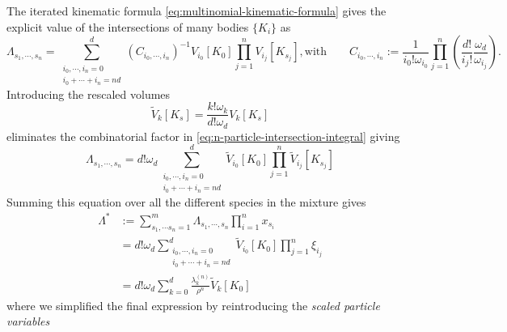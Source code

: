 \documentclass[11pt,twoside]{report}
\begin{document}
The iterated kinematic formula \eqref{eq:multinomial-kinematic-formula} gives the explicit value of the intersections of many bodies $\{K_i\}$ as \cite{Santalo2004,MarechalPRE2014}
\begin{subequations}\label{eq:multinomial-kinematic-equation}
  \begin{equation}
    \Lambda_{s_1, \cdots, s_n}
    =
      \sum_{\substack{i_0, \cdots, i_n = 0 \\ i_0 + \cdots + i_n = nd}}^d
      (C_{i_0, \cdots, i_n})^{-1}
      V_{i_0}[K_0]
      \prod_{j=1}^n
      V_{i_j}[K_{s_j}],
  \end{equation}
  \begin{equation}
    \textrm{with} \qquad
    C_{i_0, \cdots, i_n}
    := \frac{1}{i_0! \omega_{i_0}}
    \prod_{j=1}^n
    \left(
    \frac{d!}{i_j!} \frac{\omega_d}{\omega_{i_j}}
    \right).
  \end{equation}
\end{subequations}
Introducing the rescaled volumes
\begin{equation}\label{eq:rescaled-intrinsic-volumes}
  \widetilde{V}_k[K_s]
  =
  \frac{k! \omega_k}{d! \omega_d} V_k[K_s]
\end{equation}
eliminates the combinatorial factor in \eqref{eq:n-particle-intersection-integral} giving
\begin{equation}\label{eq:lambda-reduced}
  \Lambda_{s_1, \cdots, s_n}
  =
  d! \omega_d
  \sum_{\substack{i_0, \cdots, i_n = 0 \\ i_0 + \cdots + i_n = nd}}^d
  \widetilde{V}_{i_0}[K_0]
  \prod_{j=1}^n
  \widetilde{V}_{i_j}[K_{s_j}]
\end{equation}
Summing this equation over all the different species in the mixture gives
\begin{equation}
  \label{eq:final-lambda}
  \begin{split}
    \Lambda^*
    & :=
    \sum_{s_1, \cdots s_n = 1}^m
    \Lambda_{s_1, \cdots, s_n}
    \prod_{i=1}^n x_{s_i}
    \\ &=
    d! \omega_d
    \sum_{\substack{i_0, \cdots, i_n = 0 \\ i_0 + \cdots + i_n = nd}}^d
    \widetilde{V}_{i_0}[K_0]
    \prod_{j=1}^n
    \xi_{i_j}
    \\ &=
    d! \omega_d
    \sum_{k = 0}^d
    \frac{\lambda_k^{(n)}}{\rho^n}
    \widetilde{V}_{k}[K_0]
  \end{split}
\end{equation}
where we simplified the final expression by reintroducing the \emph{scaled particle variables}%
\end{document}
